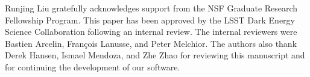 Runjing Liu gratefully acknowledges support from the NSF Graduate Research Fellowship Program.  
This paper has been approved by the LSST Dark Energy Science Collaboration following an internal review. 
The internal reviewers were Bastien Arcelin, Fran\c{c}ois Lanusse, and Peter Melchior. 
The authors also thank Derek Hansen, Ismael Mendoza, and Zhe Zhao for reviewing this manuscript and for continuing the development of our software.